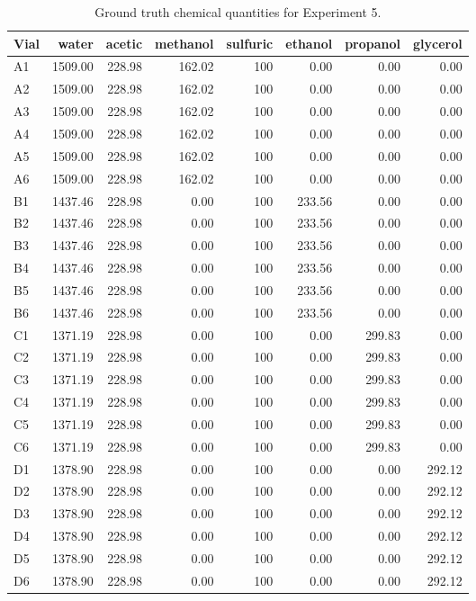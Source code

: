 \documentclass[sn-nature, twocolumn]{sn-jnl}%
\theoremstyle{thmstyleone}%
\theoremstyle{thmstyletwo}%
\theoremstyle{thmstylethree}%
\begin{document}
\begin{table}[!htb]
    \scriptsize
\begin{tabular}{lrrrrrrr}
\toprule
Vial & water & acetic & methanol & sulfuric & ethanol & propanol & glycerol \\
\midrule
A1 & 1509.00 & 228.98 & 162.02 & 100 & 0.00 & 0.00 & 0.00 \\
A2 & 1509.00 & 228.98 & 162.02 & 100 & 0.00 & 0.00 & 0.00 \\
A3 & 1509.00 & 228.98 & 162.02 & 100 & 0.00 & 0.00 & 0.00 \\
A4 & 1509.00 & 228.98 & 162.02 & 100 & 0.00 & 0.00 & 0.00 \\
A5 & 1509.00 & 228.98 & 162.02 & 100 & 0.00 & 0.00 & 0.00 \\
A6 & 1509.00 & 228.98 & 162.02 & 100 & 0.00 & 0.00 & 0.00 \\
B1 & 1437.46 & 228.98 & 0.00 & 100 & 233.56 & 0.00 & 0.00 \\
B2 & 1437.46 & 228.98 & 0.00 & 100 & 233.56 & 0.00 & 0.00 \\
B3 & 1437.46 & 228.98 & 0.00 & 100 & 233.56 & 0.00 & 0.00 \\
B4 & 1437.46 & 228.98 & 0.00 & 100 & 233.56 & 0.00 & 0.00 \\
B5 & 1437.46 & 228.98 & 0.00 & 100 & 233.56 & 0.00 & 0.00 \\
B6 & 1437.46 & 228.98 & 0.00 & 100 & 233.56 & 0.00 & 0.00 \\
C1 & 1371.19 & 228.98 & 0.00 & 100 & 0.00 & 299.83 & 0.00 \\
C2 & 1371.19 & 228.98 & 0.00 & 100 & 0.00 & 299.83 & 0.00 \\
C3 & 1371.19 & 228.98 & 0.00 & 100 & 0.00 & 299.83 & 0.00 \\
C4 & 1371.19 & 228.98 & 0.00 & 100 & 0.00 & 299.83 & 0.00 \\
C5 & 1371.19 & 228.98 & 0.00 & 100 & 0.00 & 299.83 & 0.00 \\
C6 & 1371.19 & 228.98 & 0.00 & 100 & 0.00 & 299.83 & 0.00 \\
D1 & 1378.90 & 228.98 & 0.00 & 100 & 0.00 & 0.00 & 292.12 \\
D2 & 1378.90 & 228.98 & 0.00 & 100 & 0.00 & 0.00 & 292.12 \\
D3 & 1378.90 & 228.98 & 0.00 & 100 & 0.00 & 0.00 & 292.12 \\
D4 & 1378.90 & 228.98 & 0.00 & 100 & 0.00 & 0.00 & 292.12 \\
D5 & 1378.90 & 228.98 & 0.00 & 100 & 0.00 & 0.00 & 292.12 \\
D6 & 1378.90 & 228.98 & 0.00 & 100 & 0.00 & 0.00 & 292.12 \\
\bottomrule
\end{tabular}
    \caption{Ground truth chemical quantities for Experiment 5.}
    \label{tab:placeholder}
\end{table}
\end{document}
